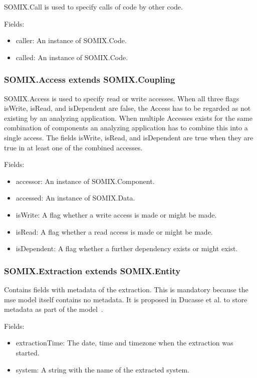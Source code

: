 \documentclass[preprint,12pt]{elsarticle}
\begin{document}
SOMIX.Call is used to specify calls of code by other code.

Fields:
\begin{itemize}
\item caller: An instance of SOMIX.Code.
\item called: An instance of SOMIX.Code.
\end{itemize}

\subsubsection{SOMIX.Access extends SOMIX.Coupling}
SOMIX.Access is used to specify read or write accesses. When all three flags isWrite, isRead, and isDependent are false, the Access has to be regarded as not existing by an analyzing application. When multiple Accesses exists for the same combination of components an analyzing application has to combine this into a single access. The fields isWrite, isRead, and isDependent are true when they are true in at least one of the combined accesses.

Fields:
\begin{itemize}
\item accessor: An instance of SOMIX.Component.
\item accessed: An instance of SOMIX.Data.
\item isWrite: A flag whether a write access is made or might be made.
\item isRead: A flag whether a read access is made or might be made. 
\item isDependent: A flag whether a further dependency exists or might exist.
\end{itemize}



\subsubsection{SOMIX.Extraction extends SOMIX.Entity}
Contains fields with metadata of the extraction. This is mandatory because the mse model itself contains no metadata. It is proposed in Ducasse et al. to store metadata as part of the model~\cite{r_Ducasse_2011}.

Fields:
\begin{itemize}
\item extractionTime: The date, time and timezone when the extraction was started.
\item system: A string with the name of the extracted system.
\end{itemize}
\end{document}
